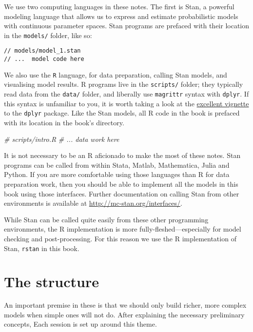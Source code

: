 \documentclass[]{book}
\newenvironment{Shaded}{\begin{snugshade}}{\end{snugshade}}
\newcommand{\CommentTok}[1]{\textcolor[rgb]{0.56,0.35,0.01}{\textit{{#1}}}}
\begin{document}
We use two computing languages in these notes. The first is Stan, a
powerful modeling language that allows us to express and estimate
probabilistic models with continuous parameter spaces. Stan programs are
prefaced with their location in the \texttt{models/} folder, like so:

\begin{verbatim}
// models/model_1.stan
// ...  model code here
\end{verbatim}

We also use the \texttt{R} language, for data preparation, calling Stan
models, and visualising model results. R programs live in the
\texttt{scripts/} folder; they typically read data from the
\texttt{data/} folder, and liberally use \texttt{magrittr} syntax with
\texttt{dplyr}. If this syntax is unfamiliar to you, it is worth taking
a look at the
\href{https://cran.rstudio.com/web/packages/dplyr/vignettes/introduction.html}{excellent
vignette} to the \texttt{dplyr} package. Like the Stan models, all R
code in the book is prefaced with its location in the book's directory.

\begin{Shaded}
\begin{Highlighting}[]
\CommentTok{# scripts/intro.R}
\CommentTok{# ... data work here}
\end{Highlighting}
\end{Shaded}

It is not necessary to be an R aficionado to make the most of these
notes. Stan programs can be called from within Stata, Matlab,
Mathematica, Julia and Python. If you are more comfortable using those
languages than R for data preparation work, then you should be able to
implement all the models in this book using those interfaces. Further
documentation on calling Stan from other environments is available at
\url{http://mc-stan.org/interfaces/}.

While Stan can be called quite easily from these other programming
environments, the R implementation is more fully-fleshed---especially
for model checking and post-processing. For this reason we use the R
implementation of Stan, \texttt{rstan} in this book.

\section*{The structure}\label{the-structure}

An important premise in these is that we should only build richer, more
complex models when simple ones will not do. After explaining the
necessary preliminary concepts, Each session is set up around this
theme.
\end{document}

